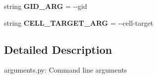 \begin{DoxyCompactItemize}
\item 
string {\bfseries G\+I\+D\+\_\+\+A\+RG} = \textquotesingle{}-\/-\/gid\textquotesingle{}\hypertarget{namespacemeshy_1_1neuromorphovis_1_1shared_1_1arguments_a747c707417442d08e500121672c12d65}{}\label{namespacemeshy_1_1neuromorphovis_1_1shared_1_1arguments_a747c707417442d08e500121672c12d65}

\item 
string {\bfseries C\+E\+L\+L\+\_\+\+T\+A\+R\+G\+E\+T\+\_\+\+A\+RG} = \textquotesingle{}-\/-\/cell-\/target\textquotesingle{}\hypertarget{namespacemeshy_1_1neuromorphovis_1_1shared_1_1arguments_a6c2ab40e4ddd5965d791303c6353ccbe}{}\label{namespacemeshy_1_1neuromorphovis_1_1shared_1_1arguments_a6c2ab40e4ddd5965d791303c6353ccbe}

\end{DoxyCompactItemize}


\subsection{Detailed Description}
\begin{DoxyVerb}arguments.py:
    Command line arguments
\end{DoxyVerb}
 
